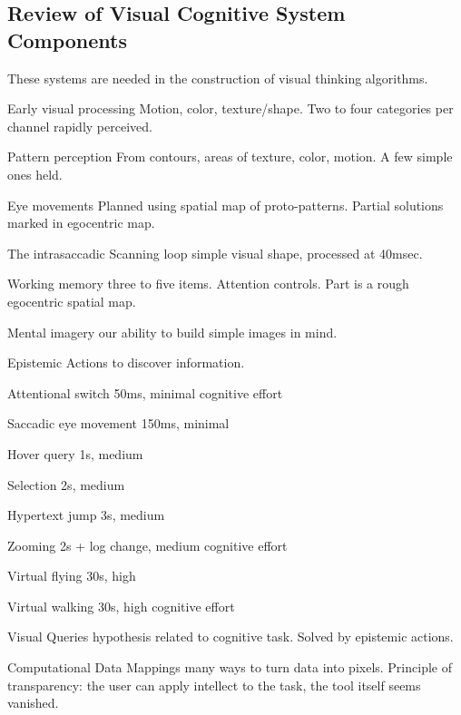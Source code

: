\begin{mdframed}\begin{multicols}{2}
\subsection{Review of Visual Cognitive System Components}
These systems are needed in the construction of visual thinking algorithms.
\begin{compactdesc}
\item[Early visual processing] Motion, color, texture/shape. Two to four
    categories per channel rapidly perceived.
\item[Pattern perception] From contours, areas of texture, color, motion. A few
    simple ones held.
\item[Eye movements] Planned using spatial map of proto-patterns.
    Partial solutions marked in egocentric map.
\item[The intrasaccadic Scanning loop] simple visual shape, processed at
    40msec.
\item[Working memory] three to five items. Attention controls. Part is a rough
    egocentric spatial map.
\item[Mental imagery] our ability to build simple images in mind.
\item[Epistemic Actions] to discover information.
    \begin{compactdesc}
    \item[Attentional switch] 50ms, minimal cognitive effort
    \item[Saccadic eye movement] 150ms, minimal
    \item[Hover query] 1s, medium
    \item[Selection] 2s, medium
    \item[Hypertext jump] 3s, medium
    \item[Zooming] 2s + log change, medium cognitive effort
    \item[Virtual flying] 30s, high
    \item[Virtual walking] 30s, high cognitive effort
    \end{compactdesc}
\item[Visual Queries] hypothesis related to cognitive task. Solved by epistemic
    actions.
\item[Computational Data Mappings] many ways to turn data into pixels. Principle
    of transparency: the user can apply intellect to the task, the tool itself
    seems vanished.
\end{compactdesc}
\end{multicols}\end{mdframed}







